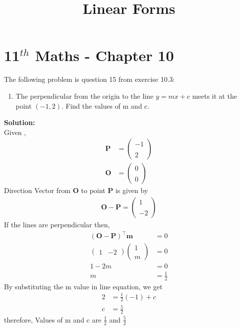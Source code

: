 \documentclass[12pt]{article}
\newcommand{\solution}{\noindent \textbf{Solution: }}
\newcommand{\myvec}[1]{\ensuremath{\begin{pmatrix}#1\end{pmatrix}}}
\let\vec\mathbf
\begin{document}
\graphicspath{{./Documents}{./figs}}
\begin{center}
  \title{\textbf{Linear Forms}}
  \date{\vspace{-5ex}}
  \maketitle
\end{center}
\setcounter{page}{1}
\section*{11$ ^{th} $ Maths - Chapter 10}
The following problem is question 15 from exercise 10.3:
\begin{enumerate}
\item The perpendicular from the origin to the line $y=mx+c$ meets it at the point $(-1,2)$. Find the values of m and c.
\end{enumerate}
\solution \\
Given ,
\begin{align}
  \vec{P}&=\begin{pmatrix}
             -1\\ \\ 2
 \end{pmatrix} \\
 \vec{O} &=\begin{pmatrix}
             0\\ \\ 0
 \end{pmatrix}
\end{align}
   Direction Vector from $\vec{O}$ to point $ \vec{P} $ is given by
    \begin{align}
    \vec{O - P} =
  \begin{pmatrix}
             1\\ \\ -2
 \end{pmatrix}
 \end{align}
 If the lines are perpendicular then,
 \begin{align}
   \vec{(O - P)}^{\top}\vec{m} &= 0\\
   \myvec{1 & -2}\myvec{1 \\ \\ m}&=0\\
   1 - 2m &= 0\\
   m &= \frac{1}{2}
\end{align}
By substituting the m value in line equation,  we get
 \begin{align}
 2 &=\frac{1}{2} (-1) + c \\
 c &=\frac{5}{2}  
\end{align}
therefore,  Values of m and c are $\frac{1}{2}$ and $\frac{5}{2}$ \\
\end{document}
